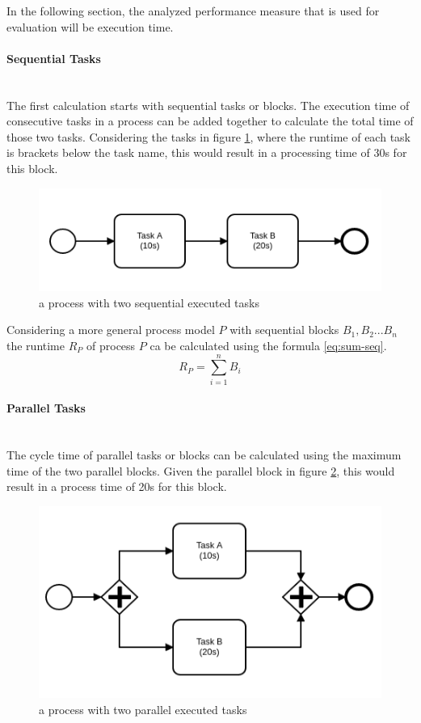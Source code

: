 In the following section, the analyzed performance measure that is used for evaluation will be execution time. 
\paragraph{Sequential Tasks}~\\
The first calculation starts with sequential tasks or blocks. The execution time of consecutive tasks in a process can be added together to calculate the total time of those two tasks. 
Considering the tasks in figure \ref{fig:sequential-tasks}, where the runtime of each task is brackets below the task name, this would result in a processing time of 30s for this block. \cite{ha2006approximate} \cite{fundamentals}

\begin{figure}[H]
	\centering
	\includegraphics[width=0.5\columnwidth]{graphics/sequential-tasks}
	\caption{a process with two sequential executed tasks} 
	\label{fig:sequential-tasks} 
\end{figure}

Considering a more general process model $P$ with sequential blocks $B_1,B_2 ... B_n$ the runtime $R_P$ of process $P$ ca be calculated using the formula \ref{eq:sum-seq}. 
\begin{equation}\label{eq:sum-seq}
	R_P = \displaystyle\sum_{i=1}^{n} B_i
\end{equation}

\paragraph{Parallel Tasks}~\\
The cycle time of parallel tasks or blocks can be calculated using the maximum time of the two parallel blocks. Given the parallel block in figure \ref{fig:parallel-tasks}, this would result in a process time of 20s for this block.\cite{fundamentals}
\begin{figure}[H]
	\centering
	\includegraphics[width=0.5\columnwidth]{graphics/paralell-tasks}
	\caption{a process with two parallel executed tasks} 
	\label{fig:parallel-tasks} 
\end{figure}

